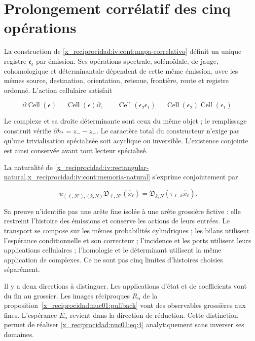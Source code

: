 \section{Prolongement corrélatif des cinq opérations}

La construction de \cref{x_reciprocidad:iv:cont:mapa-correlativo} définit un unique registre \(\mathfrak e_\epsilon\) par émission. Ses opérations spectrale, solénoïdale, de jauge, cohomologique et déterminantale dépendent de cette même émission, avec les mêmes source, destination, orientation, retenue, frontière, route et registre ordonné. L’action cellulaire satisfait

\[
\partial\operatorname{Cell}(\epsilon)=\operatorname{Cell}(\epsilon)\partial,
\qquad
\operatorname{Cell}(\epsilon_2\epsilon_1)
=\operatorname{Cell}(\epsilon_2)\operatorname{Cell}(\epsilon_1).
\]

Le complexe et sa droite déterminante sont ceux du même objet ; le remplissage construit vérifie \(\partial h_*=z_--z_+\). Le caractère total du constructeur n’exige pas qu’une trivialisation spécialisée soit acyclique ou inversible. L’existence conjointe est ainsi conservée avant tout lecteur spécialisé.

La naturalité de \cref{x_reciprocidad:iv:rectangular-natural,x_reciprocidad:iv:cont:memoria-natural} s’exprime conjointement par

\begin{equation}
u_{(\ell,N'),(k,N)}\mathfrak D_{\ell,N'}(\widehat x_\ell)
=\mathfrak D_{k,N}(\tau_{\ell,k}\widehat x_\ell).
\label{x_reciprocidad:nuc01:eq:4}
\end{equation}

Sa preuve n’identifie pas une arête fine isolée à une arête grossière fictive : elle restreint l’histoire des émissions et conserve les actions de leurs entrées. Le transport se compose sur les mêmes probabilités cylindriques ; les bilans utilisent l’espérance conditionnelle et son correcteur ; l’incidence et les ports utilisent leurs applications cellulaires ; l’homologie et le déterminant utilisent la même application de complexes. Ce ne sont pas cinq limites d’histoires choisies séparément.

Il y a deux directions à distinguer. Les applications d’état et de coefficients vont du fin au grossier. Les images réciproques \(R_n\) de la proposition~\ref{x_reciprocidad:nuc01:pullback} vont des observables grossières aux fines. L’espérance \(E_n\) revient dans la direction de réduction. Cette distinction permet de réaliser \eqref{x_reciprocidad:nuc01:eq:4} analytiquement sans inverser ses domaines.

